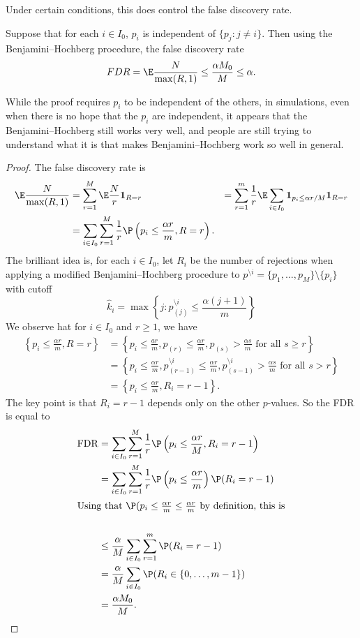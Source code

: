 \documentclass[a4paper]{article}
\begin{document}
Under certain conditions, this does control the false discovery rate.
\begin{thm}
  Suppose that for each $i \in I_0$, $p_i$ is independent of $\{p_j: j \not= i\}$. Then using the Benjamini--Hochberg procedure, the false discovery rate
  \[
    FDR = \E \frac{N}{\max (R, 1)} \leq \frac{\alpha M_0}{M} \leq \alpha.
  \]
\end{thm}
While the proof requires $p_i$ to be independent of the others, in simulations, even when there is no hope that the $p_i$ are independent, it appears that the Benjamini--Hochberg still works very well, and people are still trying to understand what it is that makes Benjamini--Hochberg work so well in general.

\begin{proof}
  The false discovery rate is
  \begin{align*}
    \E \frac{N}{\max (R, 1)} &= \sum_{r = 1}^M \E \frac{N}{r} \mathbf{1}_{R = r}\
    &= \sum_{r = 1}^m \frac{1}{r} \E \sum_{i \in I_0} \mathbf{1}_{p_i \leq \alpha r/M} \mathbf{1}_{R = r}\\
    &= \sum_{i \in I_0} \sum_{r = 1}^M \frac{1}{r} \P\left(p_i \leq \frac{\alpha r}{m}, R = r\right).
  \end{align*}
  The brilliant idea is, for each $i \in I_0$, let $R_i$ be the number of rejections when applying a modified Benjamini--Hochberg procedure to $p^{\setminus i} = \{p_1, \ldots, p_M\} \setminus \{p_i\}$ with cutoff
  \[
    \hat{k}_i = \max \left\{j: p_{(j)}^{\setminus i} \leq \frac{\alpha (j + 1)}{m}\right\}
  \]
  We observe hat for $i \in I_0$ and $r \geq 1$, we have
  \begin{align*}
    \left\{ p_i \leq \frac{\alpha r}{m} , R = r\right\} &= \left\{ p_i \leq \frac{ar}{m}, p_{(r)} \leq \frac{\alpha r}{m}, p_{(s)} > \frac{\alpha s}{m}\text{ for all }s \geq r\right\}\\
    &= \left\{p_i \leq \frac{\alpha r}{m}, p_{(r - 1)}^{\setminus i} \leq \frac{\alpha r}{m}, p^{\setminus i}_{(s - 1)} > \frac{\alpha s}{m}\text{ for all }s > r\right\}\\
    &= \left\{p_i \leq \frac{\alpha r}{m}, R_i = r - 1\right\}.
  \end{align*}
  The key point is that $R_i = r - 1$ depends only on the other $p$-values. So the FDR is equal to
  \begin{align*}
    \mathrm{FDR} &= \sum_{i \in I_0} \sum_{r = 1}^M \frac{1}{r} \P\left(p_i \leq \frac{\alpha r}{M}, R_i = r - 1\right)\\
    &= \sum_{i \in I_0} \sum_{r = 1}^M \frac{1}{r} \P \left(p_i \leq \frac{\alpha r}{m}\right) \P(R_i = r - 1)\\
    \intertext{Using that $\P(p_i \leq \frac{\alpha r}{m} \leq \frac{\alpha r}{m}$ by definition, this is}\\
    &\leq \frac{\alpha }{M} \sum_{i \in I_0} \sum_{r = 1}^m \P(R_i = r - 1)\\
    &= \frac{\alpha}{M} \sum_{i \in I_0} \P(R_i \in \{0, \ldots, m - 1\})\\
    &= \frac{\alpha M_0}{M}.
  \end{align*}
\end{proof}
\end{document}

